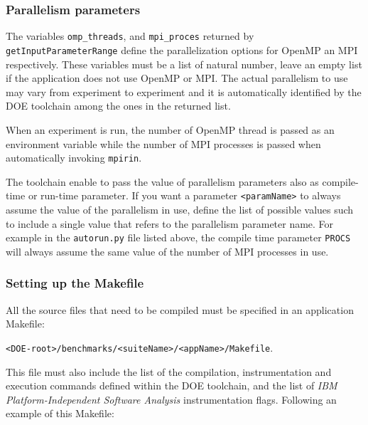 \documentclass[a4paper, 10pt]{article}
\begin{document}
\subsubsection*{Parallelism parameters}

The variables \verb!omp_threads!, and \verb!mpi_proces! returned by \verb!getInputParameterRange!
define the parallelization options for OpenMP an MPI respectively.
These variables must be a list of natural number, leave an empty list if the application does not use OpenMP or MPI.
The actual parallelism to use may vary from experiment to experiment and it is automatically identified  by the DOE toolchain
among the ones in the returned list.

When an experiment is run, the number of OpenMP thread is passed as an environment variable while the number of MPI processes
is passed when automatically invoking \verb!mpirin!.

The toolchain enable to pass the value of parallelism parameters also as compile-time or run-time parameter. 
If you want a parameter \verb!<paramName>! to always assume the value of the parallelism in use,
define the list of possible values such to include a single value that refers to the parallelism parameter name.
For example in the \verb!autorun.py! file listed above, the compile time parameter \verb!PROCS! will always assume
the same value of the number of MPI processes in use.

\subsubsection{Setting up the Makefile}

All the source files that need to be compiled must be specified in an application Makefile:

\verb!<DOE-root>/benchmarks/<suiteName>/<appName>/Makefile!.

This file must also include the list of the compilation, instrumentation and execution commands defined within the DOE toolchain,
and the list of \textit{IBM Platform-Independent Software Analysis} instrumentation flags.
Following an example of this Makefile:
\end{document}
